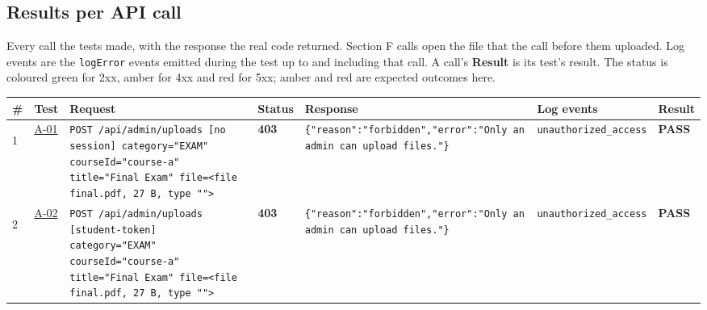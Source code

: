 \documentclass[10pt,a4paper]{article}
\begin{document}
\begin{landscape}
\section*{Results per API call}
Every call the tests made, with the response the real code returned. Section F calls open the file that the call before them uploaded. Log events are the \texttt{logError} events emitted during the test up to and including that call. A call's \textbf{Result} is its test's result. The status is coloured green for 2xx, amber for 4xx and red for 5xx; amber and red are expected outcomes here.

\footnotesize
\begin{longtable}{@{}P{0.6cm}P{0.9cm}P{8.5cm}P{1.0cm}P{6.2cm}P{4.2cm}P{1.1cm}@{}}
\toprule \textbf{\#} & \textbf{Test} & \textbf{Request} & \textbf{Status} & \textbf{Response} & \textbf{Log events} & \textbf{Result} \\ \midrule \endhead
\hypertarget{call1}{1} & \hyperlink{test-A-01}{A-01} & \texttt{POST /\allowbreak{}api/\allowbreak{}admin/\allowbreak{}uploads [no session] category=\allowbreak{}"\allowbreak{}EXAM"\allowbreak{} courseId=\allowbreak{}"\allowbreak{}course-\allowbreak{}a"\allowbreak{} title=\allowbreak{}"\allowbreak{}Final Exam"\allowbreak{} file=\allowbreak{}<file final.\allowbreak{}pdf,\allowbreak{} 27 B,\allowbreak{} type "\allowbreak{}"\allowbreak{}>} & \textcolor{warnamber}{\textbf{403}} & \texttt{\{"\allowbreak{}reason"\allowbreak{}:\allowbreak{}"\allowbreak{}forbidden"\allowbreak{},\allowbreak{}"\allowbreak{}error"\allowbreak{}:\allowbreak{}"\allowbreak{}Only an admin can upload files.\allowbreak{}"\allowbreak{}\}} & \texttt{unauthorized\_\allowbreak{}access} & \textcolor{passgreen}{\textbf{PASS}} \\
\hypertarget{call2}{2} & \hyperlink{test-A-02}{A-02} & \texttt{POST /\allowbreak{}api/\allowbreak{}admin/\allowbreak{}uploads [student-\allowbreak{}token] category=\allowbreak{}"\allowbreak{}EXAM"\allowbreak{} courseId=\allowbreak{}"\allowbreak{}course-\allowbreak{}a"\allowbreak{} title=\allowbreak{}"\allowbreak{}Final Exam"\allowbreak{} file=\allowbreak{}<file final.\allowbreak{}pdf,\allowbreak{} 27 B,\allowbreak{} type "\allowbreak{}"\allowbreak{}>} & \textcolor{warnamber}{\textbf{403}} & \texttt{\{"\allowbreak{}reason"\allowbreak{}:\allowbreak{}"\allowbreak{}forbidden"\allowbreak{},\allowbreak{}"\allowbreak{}error"\allowbreak{}:\allowbreak{}"\allowbreak{}Only an admin can upload files.\allowbreak{}"\allowbreak{}\}} & \texttt{unauthorized\_\allowbreak{}access} & \textcolor{passgreen}{\textbf{PASS}} \\

\end{longtable}
\end{landscape}
\end{document}
